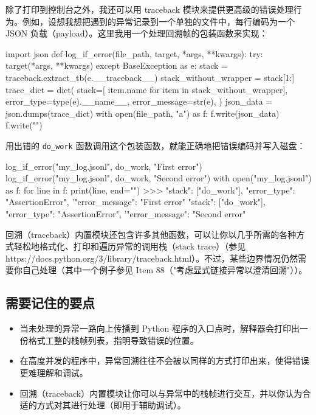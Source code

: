 除了打印到控制台之外，我还可以用 traceback 模块来提供更高级的错误处理行为。例如，设想我想把遇到的异常记录到一个单独的文件中，每行编码为一个 JSON 负载（payload）。这里我用一个处理回溯帧的包装函数来实现：

\begin{codebox}[python]
import json
def log_if_error(file_path, target, *args, **kwargs):
    try:
        target(*args, **kwargs)
    except BaseException as e:
        stack = traceback.extract_tb(e.__traceback__)
        stack_without_wrapper = stack[1:]
        trace_dict = dict(
            stack=[ item.name
for item in stack_without_wrapper],
            error_type=type(e).__name__,
            error_message=str(e),
        )
        json_data = json.dumps(trace_dict)
        with open(file_path, "a") as f:
            f.write(json_data)
            f.write("\n")
\end{codebox}

用出错的 \texttt{do\_work} 函数调用这个包装函数，就能正确地把错误编码并写入磁盘：

\begin{codebox}[python]
log_if_error("my_log.jsonl", do_work, "First error")
log_if_error("my_log.jsonl", do_work, "Second error")
with open("my_log.jsonl") as f:
    for line in f:
        print(line, end="")
>>>
{"stack": ["do_work"], "error_type": "AssertionError",
'"error_message": "First error"}
{"stack": ["do_work"], "error_type": "AssertionError",
'"error_message": "Second error"}
\end{codebox}

回溯（traceback）内置模块还包含许多其他函数，可以让你以几乎所需的各种方式轻松地格式化、打印和遍历异常的调用栈（stack trace）（参见 https://docs.python.org/3/library/traceback.html）。不过，某些边界情况仍然需要你自己处理（其中一个例子参见 Item 88（"考虑显式链接异常以澄清回溯"））。

\subsection{需要记住的要点}

\begin{itemize}
\item 当未处理的异常一路向上传播到 Python 程序的入口点时，解释器会打印出一份格式工整的栈帧列表，指明导致错误的位置。
\item 在高度并发的程序中，异常回溯往往不会被以同样的方式打印出来，使得错误更难理解和调试。
\item 回溯（traceback）内置模块让你可以与异常中的栈帧进行交互，并以你认为合适的方式对其进行处理（即用于辅助调试）。
\end{itemize}


